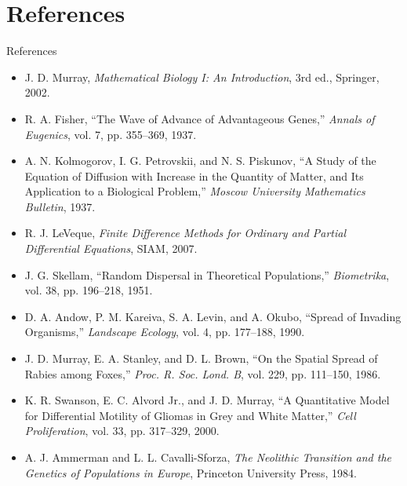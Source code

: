 \documentclass[10pt]{beamer}
\begin{document}
\section{References}
  \begin{frame}[allowframebreaks]{References}
    \begin{itemize}
        \item[\textbf{[1]}] J. D. Murray,
        \textit{Mathematical Biology I: An Introduction},
        3rd ed., Springer, 2002.

        \item[\textbf{[2]}] R. A. Fisher,
        ``The Wave of Advance of Advantageous Genes,''
        \textit{Annals of Eugenics}, vol. 7, pp. 355--369, 1937.

        \item[\textbf{[3]}] A. N. Kolmogorov, I. G. Petrovskii, and N. S. Piskunov,
        ``A Study of the Equation of Diffusion with Increase in the Quantity of Matter,
        and Its Application to a Biological Problem,''
        \textit{Moscow University Mathematics Bulletin}, 1937.

        \item[\textbf{[4]}] R. J. LeVeque,
        \textit{Finite Difference Methods for Ordinary and Partial Differential Equations},
        SIAM, 2007.

        \item[\textbf{[5]}] J. G. Skellam,
        ``Random Dispersal in Theoretical Populations,''
        \textit{Biometrika}, vol. 38, pp. 196--218, 1951.

        \item[\textbf{[6]}] D. A. Andow, P. M. Kareiva, S. A. Levin, and A. Okubo,
        ``Spread of Invading Organisms,''
        \textit{Landscape Ecology}, vol. 4, pp. 177--188, 1990.

        \item[\textbf{[7]}] J. D. Murray, E. A. Stanley, and D. L. Brown,
        ``On the Spatial Spread of Rabies among Foxes,''
        \textit{Proc. R. Soc. Lond. B}, vol. 229, pp. 111--150, 1986.

        \item[\textbf{[8]}] K. R. Swanson, E. C. Alvord Jr., and J. D. Murray,
        ``A Quantitative Model for Differential Motility of Gliomas in Grey and White Matter,''
        \textit{Cell Proliferation}, vol. 33, pp. 317--329, 2000.

        \item[\textbf{[9]}] A. J. Ammerman and L. L. Cavalli-Sforza,
        \textit{The Neolithic Transition and the Genetics of Populations in Europe},
        Princeton University Press, 1984.


\end{itemize}
\end{frame}
\end{document}
